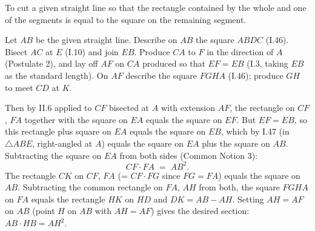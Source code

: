 \begin{claim}
\label{prop:II.11}
To cut a given straight line so that the rectangle contained by the
whole and one of the segments is equal to the square on the remaining
segment.
\end{claim}
\begin{evidence}[Proof of II.11]
\label{ev:II.11}

Let $AB$ be the given straight line.  Describe on $AB$ the square
$ABDC$ (I.46).  Bisect $AC$ at $E$ (I.10) and join $EB$.  Produce
$CA$ to $F$ in the direction of $A$ (Postulate 2), and lay off
$AF$ on $CA$ produced so that $EF = EB$ (I.3, taking $EB$ as
the standard length).  On $AF$ describe the square $FGHA$ (I.46);
produce $GH$ to meet $CD$ at $K$.

Then by II.6 applied to $CF$ bisected at $A$ with extension $AF$,
the rectangle on $CF$, $FA$ together with the square on $EA$ equals
the square on $EF$.  But $EF = EB$, so this rectangle plus square
on $EA$ equals the square on $EB$, which by I.47 (in
$\triangle ABE$, right-angled at $A$) equals the square on $EA$
plus the square on $AB$.  Subtracting the square on $EA$ from both
sides (Common Notion 3):
\[
    CF \cdot FA \;=\; AB^2.
\]
The rectangle $CK$ on $CF$, $FA$ (= $CF \cdot FG$ since $FG = FA$)
equals the square on $AB$.  Subtracting the common rectangle on
$FA$, $AH$ from both, the square $FGHA$ on $FA$ equals the rectangle
$HK$ on $HD$ and $DK = AB - AH$.  Setting $AH = AF$ on $AB$ (point
$H$ on $AB$ with $AH = AF$) gives the desired section: $AB \cdot HB
= AH^2$.
\end{evidence}

